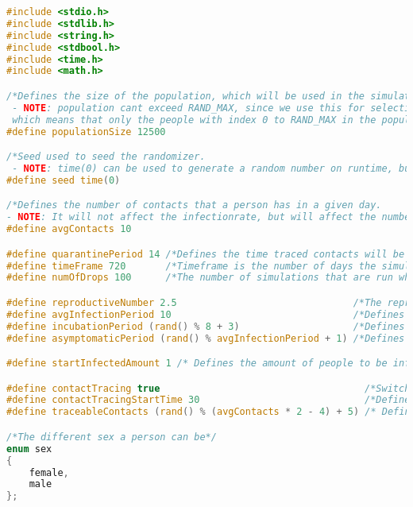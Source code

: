 \begin{lstlisting}[language=c, caption={Our simulations written in c}, captionpos=b, label={snippet:LABELNAVN}]
#include <stdio.h>
#include <stdlib.h>
#include <string.h>
#include <stdbool.h>
#include <time.h>
#include <math.h>

/*Defines the size of the population, which will be used in the simulation
 - NOTE: population cant exceed RAND_MAX, since we use this for selection when infecting, 
 which means that only the people with index 0 to RAND_MAX in the population array can be selected*/
#define populationSize 12500

/*Seed used to seed the randomizer.
 - NOTE: time(0) can be used to generate a random number on runtime, but any int can be used*/
#define seed time(0)

/*Defines the number of contacts that a person has in a given day. 
- NOTE: It will not affect the infectionrate, but will affect the number of people quarantined if contact tracing is on*/
#define avgContacts 10

#define quarantinePeriod 14 /*Defines the time traced contacts will be quarantined*/
#define timeFrame 720       /*Timeframe is the number of days the simulation will run for*/
#define numOfDrops 100      /*The number of simulations that are run when the program starts*/

#define reproductiveNumber 2.5                               /*The reproductive number is the number of people an infected person infects on average.*/
#define avgInfectionPeriod 10                                /*Defines how long people will be infected for*/
#define incubationPeriod (rand() % 8 + 3)                    /*Defines how long people will be in incubation before they become sick and can infect others*/
#define asymptomaticPeriod (rand() % avgInfectionPeriod + 1) /*Defines how long the person will be asymptomatic -NOTE: This affects contact tracing*/

#define startInfectedAmount 1 /* Defines the amount of people to be infected on day 1 of the simulation*/

#define contactTracing true                                    /*Switch to false to turn off contact tracing*/
#define contactTracingStartTime 30                             /*Defines from what day the contact tracing begins in the simulation*/
#define traceableContacts (rand() % (avgContacts * 2 - 4) + 5) /* Defines how many contacts of an infected person that can be traced */

/*The different sex a person can be*/
enum sex
{
    female,
    male
};


\end{lstlisting}
